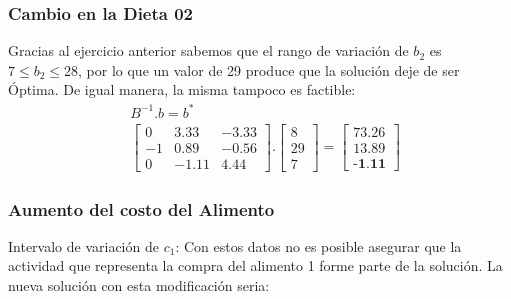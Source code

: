 \begin{homeworkProblem}
\subsubsection{Cambio en la Dieta 02}
Gracias al ejercicio anterior sabemos que el rango de variación de $b_2$ es $7 \le b_2 \le 28$, por lo que un valor de 29 produce que la solución deje de ser Óptima. De igual manera, la misma tampoco es factible:
\begin{align*}
  &B^{-1}.b = b^{*} \\
  &\begin{bmatrix}
   0 & 3.33 & -3.33 \\
   -1 & 0.89 & -0.56 \\
   0 & -1.11 & 4.44 
  \end{bmatrix}.
  \begin{bmatrix}
   8 \\
   29 \\
   7
  \end{bmatrix} =
  \begin{bmatrix}
   73.26 \\
   13.89 \\
   \textbf{-1.11}
  \end{bmatrix}
\end{align*}

\subsubsection{Aumento del costo del Alimento}
Intervalo de variación de $c_1$: 
Con estos datos no es posible asegurar que la actividad que representa la compra del alimento 1 forme parte de la solución. La nueva solución con esta modificación seria: 


\end{homeworkProblem}
